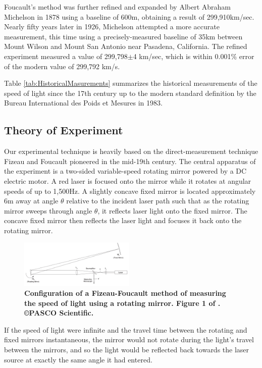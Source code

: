 \documentclass[twocolumn]{article}
\begin{document}
		Foucault's method was further refined and expanded by Albert Abraham Michelson in 1878 using a baseline of 600m, obtaining a result of 299,910km/sec.\cite{michelson_experimental_1878}
		Nearly fifty years later in 1926, Michelson attempted a more accurate measurement, this time using a precisely-measured baseline of 35km between Mount Wilson and Mount San Antonio near Pasadena, California.
		The refined experiment measured a value of 299,798$\pm$4 km/sec, which is within 0.001\% error of the modern value of 299,792 km/s.\cite{michelson_measurement_1927}
		
		Table \ref{tab:HistoricalMasurements} summarizes the historical measurements of the speed of light since the 17th century up to the modern standard definition by the Bureau International des Poids et Mesures in 1983.\cite{_bipm_1984}
		
		
	\subsection{Theory of Experiment}
		Our experimental technique is heavily based on the direct-measurement technique Fizeau and Foucault pioneered in the mid-19th century.
		The central apparatus of the experiment is a two-sided variable-speed rotating mirror powered by a DC electric motor.
		A red laser is focused onto the mirror while it rotates at angular speeds of up to 1,500Hz.
		A slightly concave fixed mirror is located approximately 6m away at angle $\theta$ relative to the incident laser path such that as the rotating mirror sweeps through angle $\theta$, it reflects laser light onto the fixed mirror.
		The concave fixed mirror then reflects the laser light and focuses it back onto the rotating mirror.
		
		\begin{figure}[!ht]
			\centering
			\includegraphics[width=0.49\textwidth]{Images/FoucaultMethodDiagram.png}
			\caption{\textbf{Configuration of a Fizeau-Foucault method of measuring the speed of light using a rotating mirror. Figure 1 of \cite{lee_instruction_????}. \copyright PASCO Scientific.}}
			\label{fig:FoucaultDiagram}
		\end{figure}
		
		If the speed of light were infinite and the travel time between the rotating and fixed mirrors instantaneous, the mirror would not rotate during the light's travel between the mirrors, and so the light would be reflected back towards the laser source at exactly the same angle it had entered.
		
\end{document}
